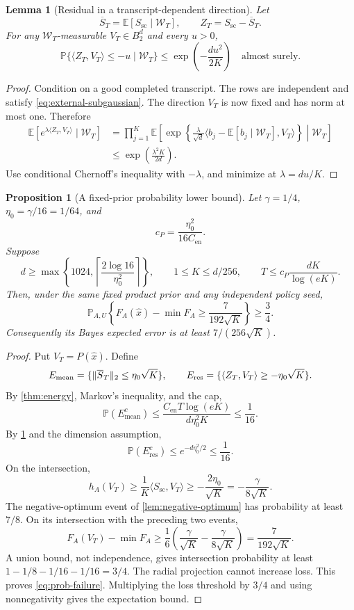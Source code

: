 \documentclass[11pt]{article}
\numberwithin{equation}{section}
\newtheorem{lemma}[lemma]{Lemma}
\newtheorem{proposition}[proposition]{Proposition}
\theoremstyle{definition}
\theoremstyle{remark}
\newcommand{\E}{\mathbb E}
\newcommand{\PP}{\mathbb P}
\newcommand{\cW}{\mathcal W}
\newcommand{\Cen}{C_{\mathrm{en}}}
\DeclarePairedDelimiter{\norm}{\lVert}{\rVert}
\newcommand{\ip}[2]{\langle #1,#2\rangle}
\newcommand{\ball}{B_2^d}
\begin{document}
\begin{lemma}[Residual in a transcript-dependent direction]\label{lem:residual}
Let
\[
\overline S_T=\E[S_{\mathrm{sc}}\mid\cW_T],\qquad
Z_T=S_{\mathrm{sc}}-\overline S_T.
\]
For any $\cW_T$-measurable $V_T\in\ball$ and every $u>0$,
\begin{equation}\label{eq:residual-tail}
\PP\{\ip{Z_T}{V_T}\le-u\mid\cW_T\}
\le\exp\left(-\frac{du^2}{2K}\right)
\quad\text{almost surely}.
\end{equation}
\end{lemma}
\begin{proof}
Condition on a good completed transcript. The rows are independent and satisfy \eqref{eq:external-subgaussian}. The direction $V_T$ is now fixed and has norm at most one. Therefore
\begin{align*}
\E[e^{\lambda\ip{Z_T}{V_T}}\mid\cW_T]
&=\prod_{j=1}^K\E\left[
\exp\left\{\frac\lambda{\sqrt d}\ip{b_j-\E[b_j\mid\cW_T]}{V_T}\right\}
\middle|\cW_T\right]\\
&\le\exp\left(\frac{\lambda^2K}{2d}\right).
\end{align*}
Use conditional Chernoff's inequality with $-\lambda$, and minimize at $\lambda=du/K$.
\end{proof}

\begin{proposition}[A fixed-prior probability lower bound]\label{prop:probability}
Let $\gamma=1/4$, $\eta_0=\gamma/16=1/64$, and
\[
c_P=\frac{\eta_0^2}{16\Cen}.
\]
Suppose
\[
d\ge\max\left\{1024,\left\lceil\frac{2\log16}{\eta_0^2}\right\rceil\right\},
\qquad 1\le K\le d/256,
\qquad T\le c_P\frac{dK}{\log(eK)}.
\]
Then, under the same fixed product prior and any independent policy seed,
\begin{equation}\label{eq:prob-failure}
\PP_{A,U}\left\{F_A(\widehat x)-\min F_A\ge\frac7{192\sqrt K}\right\}
\ge\frac34.
\end{equation}
Consequently its Bayes expected error is at least $7/(256\sqrt K)$.
\end{proposition}
\begin{proof}
Put $V_T=P(\widehat x)$. Define
\[
E_{\mathrm{mean}}=\{\norm{\overline S_T}_2\le\eta_0\sqrt K\},
\qquad
E_{\mathrm{res}}=\{\ip{Z_T}{V_T}\ge-\eta_0\sqrt K\}.
\]
By \cref{thm:energy}, Markov's inequality, and the cap,
\[
\PP(E_{\mathrm{mean}}^c)
\le\frac{\Cen T\log(eK)}{d\eta_0^2K}\le\frac1{16}.
\]
By \cref{lem:residual} and the dimension assumption,
\[
\PP(E_{\mathrm{res}}^c)\le e^{-d\eta_0^2/2}\le\frac1{16}.
\]
On the intersection,
\[
h_A(V_T)\ge\frac1K\ip{S_{\mathrm{sc}}}{V_T}
\ge-\frac{2\eta_0}{\sqrt K}
=-\frac\gamma{8\sqrt K}.
\]
The negative-optimum event of \cref{lem:negative-optimum} has probability at least $7/8$. On its intersection with the preceding two events,
\[
F_A(V_T)-\min F_A
\ge\frac16\left(\frac\gamma{\sqrt K}-\frac\gamma{8\sqrt K}\right)
=\frac7{192\sqrt K}.
\]
A union bound, not independence, gives intersection probability at least $1-1/8-1/16-1/16=3/4$. The radial projection cannot increase loss. This proves \eqref{eq:prob-failure}. Multiplying the loss threshold by $3/4$ and using nonnegativity gives the expectation bound.
\end{proof}
\end{document}
